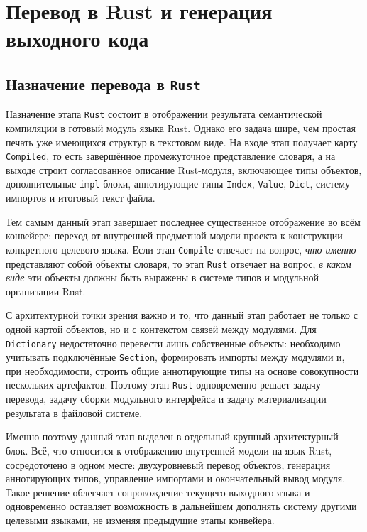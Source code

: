 \documentclass[a4paper,12pt]{article}
\begin{document}
\pagebreak

\section{Перевод в Rust и генерация выходного кода}

\subsection{Назначение перевода в \texttt{Rust}}

Назначение этапа \texttt{Rust} состоит в отображении результата семантической
компиляции в готовый модуль языка Rust. Однако его задача шире, чем простая
печать уже имеющихся структур в текстовом виде. На входе этап получает карту
\texttt{Compiled}, то есть завершённое промежуточное представление словаря, а на выходе
строит согласованное описание Rust-модуля, включающее типы объектов, дополнительные
\texttt{impl}-блоки, аннотирующие типы \texttt{Index}, \texttt{Value}, \texttt{Dict},
систему импортов и итоговый текст файла.

Тем самым данный этап завершает последнее существенное отображение во всём конвейере:
переход от внутренней предметной модели проекта к конструкции конкретного целевого
языка. Если этап \texttt{Compile} отвечает на вопрос, \textit{что именно} представляют
собой объекты словаря, то этап \texttt{Rust} отвечает на вопрос, \textit{в каком виде}
эти объекты должны быть выражены в системе типов и модульной организации Rust.

С архитектурной точки зрения важно и то, что данный этап работает не только с одной
картой объектов, но и с контекстом связей между модулями. Для \texttt{Dictionary}
недостаточно перевести лишь собственные объекты: необходимо учитывать подключённые
\texttt{Section}, формировать импорты между модулями и, при необходимости, строить
общие аннотирующие типы на основе совокупности нескольких артефактов. Поэтому этап
\texttt{Rust} одновременно решает задачу перевода, задачу сборки модульного интерфейса и
задачу материализации результата в файловой системе.

Именно поэтому данный этап выделен в отдельный крупный архитектурный блок.
Всё, что относится к отображению внутренней модели на язык Rust, сосредоточено в одном
месте: двухуровневый перевод объектов, генерация аннотирующих типов, управление
импортами и окончательный вывод модуля. Такое решение облегчает сопровождение текущего
выходного языка и одновременно оставляет возможность в дальнейшем дополнять систему
другими целевыми языками, не изменяя предыдущие этапы конвейера.
\end{document}

